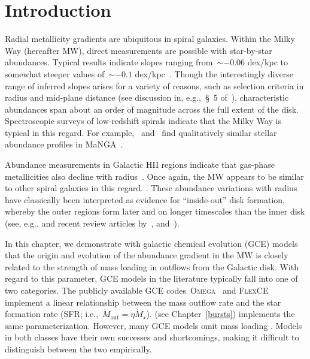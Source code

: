 
\section{Introduction}
\label{outflows:sec:intro}
\noindent
Radial metallicity gradients are ubiquitous in spiral galaxies.
Within the Milky Way (hereafter MW), direct measurements are possible with
star-by-star abundances.
Typical results indicate slopes ranging from~$\sim$$-0.06$ dex/kpc to somewhat
steeper values of~$\sim$$-0.1$ dex/kpc~\citep[e.g.,][]{Nordstroem2004, Cheng2012,
Frinchaboy2013, Hayden2014, Weinberg2019, Myers2022}.
Though the interestingly diverse range of inferred slopes arises for a variety
of reasons, such as selection criteria in radius and mid-plane distance (see
discussion in, e.g.,~\S~5 of~\citealt{Anders2017}), characteristic abundances
span about an order of magnitude across the full extent of the disk.
Spectroscopic surveys of low-redshift spirals indicate that the Milky Way is
typical in this regard.
For example,~\citet{Goddard2017} and~\citet{Parikh2021} find qualitatively
similar stellar abundance profiles in MaNGA~\citep{Bundy2015}.
\par
Abundance measurements in Galactic HII regions indicate that gas-phase
metallicities also decline with radius~\citep[e.g.,][]{Simpson1995,
Afflerbach1997, Esteban2022, MendezDelgado2022, MendezDelgado2023}.
Once again, the MW appears to be similar to other spiral galaxies in this
regard.
\citep[e.g.,][]{Belfiore2017, Berg2020, Franchetto2021, Lutz2021,
Boardman2022}.
These abundance variations with radius have classically been interpreted as
evidence for ``inside-out'' disk formation, whereby the outer regions form
later and on longer timescales than the inner disk (see, e.g.,
\citealt{Kauffmann1996} and recent review articles by~\citealt{Kewley2019,
Maiolino2019}, and~\citealt{Sanchez2020}).
\par
In this chapter, we demonstrate with galactic chemical evolution (GCE) models
that the origin and evolution of the abundance gradient in the MW is closely
related to the strength of mass loading in outflows from the Galactic disk.
With regard to this parameter, GCE models in the literature typically fall into
one of two categories.
The publicly available GCE codes~\textsc{Omega}~\citep{Cote2017} and
\textsc{FlexCE}~\citep{Andrews2017} implement a linear relationship between the
mass outflow rate and the star formation rate (SFR;
i.e.,~$\dot{M}_\text{out} = \eta \dot{M}_\star$).
\vice\space(see Chapter~\ref{bursts}) implements the same parameterization.
However, many GCE models omit mass loading
\citep[i.e.,~$\eta = 0$; e.g.,][]{Minchev2013, Minchev2014, Spitoni2019,
Spitoni2020, Spitoni2021, Gjergo2023}.
Models in both classes have their own successes and shortcomings, making it
difficult to distinguish between the two empirically.


